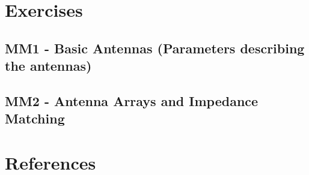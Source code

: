 



    \singlespacing
    \pagestyle{empty}	
	
	\cleardoublepage
	
	\pagestyle{plain}
		
	\tableofcontents 
	\onehalfspacing
	\pagestyle{fancy} %
    \setcounter{page}{0} %

\part{Exercises}

\chapter{MM1 - Basic Antennas (Parameters describing the antennas)}




\chapter{MM2 - Antenna Arrays and Impedance Matching}







\part{References}






